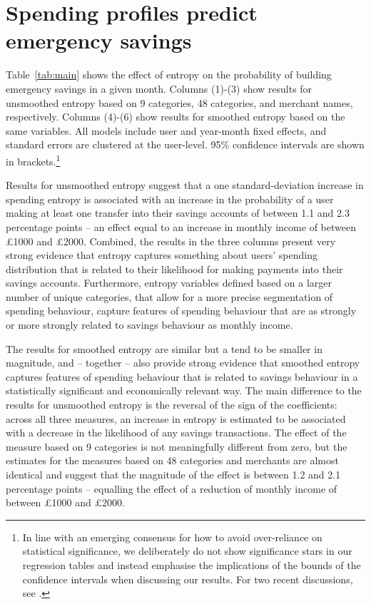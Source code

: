 
\section{Spending profiles predict emergency savings}%
\label{sec:results}

Table~\ref{tab:main} shows the effect of entropy on the probability of building
emergency savings in a given month. Columns (1)-(3) show results for unsmoothed
entropy based on 9 categories, 48 categories, and merchant names, respectively.
Columns (4)-(6) show results for smoothed entropy based on the same variables.
All models include user and year-month fixed effects, and standard errors are
clustered at the user-level. 95\% confidence intervals are shown in
brackets.\footnote{In line with an emerging consensus for how to avoid
    over-reliance on statistical significance, we deliberately do not show
    significance stars in our regression tables and instead emphasise the
    implications of the bounds of the confidence intervals when discussing our
    results. For two recent discussions, see \citet{imbens2021statistical,
romer2020praise}.}

Results for unsmoothed entropy suggest that a one standard-deviation increase
in spending entropy is associated with an increase in the probability of a user
making at least one transfer into their savings accounts of between 1.1 and 2.3
percentage points -- an effect equal to an increase in monthly income of
between \pounds1000 and \pounds2000. Combined, the results in the three columns
present very strong evidence that entropy captures something about users'
spending distribution that is related to their likelihood for making payments
into their savings accounts. Furthermore, entropy variables defined based on a
larger number of unique categories, that allow for a more precise segmentation
of spending behaviour, capture features of spending behaviour that are as
strongly or more strongly related to savings behaviour as monthly income.

The results for smoothed entropy are similar but a tend to be smaller in
magnitude, and -- together -- also provide strong evidence that smoothed
entropy captures features of spending behaviour that is related to savings
behaviour in a statistically significant and economically relevant way. The
main difference to the results for unsmoothed entropy is the reversal of the
sign of the coefficients: across all three measures, an increase in entropy is
estimated to be associated with a decrease in the likelihood of any savings
transactions. The effect of the measure based on 9 categories is not
meaningfully different from zero, but the estimates for the measures based on
48 categories and merchants are almost identical and suggest that the magnitude
of the effect is between 1.2 and 2.1 percentage points -- equalling the effect
of a reduction of monthly income of between \pounds1000 and \pounds2000.

